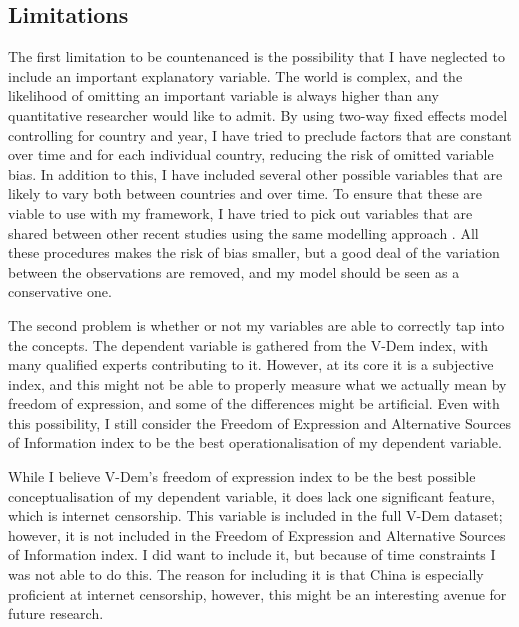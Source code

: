 \subsection{Limitations}
The first limitation to be countenanced is the possibility that I have neglected to include an important explanatory variable. The world is complex, and the likelihood of omitting an important variable is always higher than any quantitative researcher would like to admit. By using two-way fixed effects model controlling for country and year, I have tried to preclude factors that are constant over time and for each individual country, reducing the risk of omitted variable bias. In addition to this, I have included several other possible variables that are likely to vary both between countries and over time. To ensure that these are viable to use with my framework, I have tried to pick out variables that are shared between other recent studies using the same modelling approach \citep{gamso_is_2021, toettoe_foreign_2023}. All these procedures makes the risk of bias smaller, but a good deal of the variation between the observations are removed, and my model should be seen as a conservative one. 

The second problem is whether or not my variables are able to correctly tap into the concepts. The dependent variable is gathered from the V-Dem index, with many qualified experts contributing to it. However, at its core it is a subjective index, and this might not be able to properly measure what we actually mean by freedom of expression, and some of the differences might be artificial. Even with this possibility, I still consider the Freedom of Expression and Alternative Sources of Information index to be the best operationalisation of my dependent variable.

While I believe V-Dem's freedom of expression index to be the best possible conceptualisation of my dependent variable, it does lack one significant feature, which is internet censorship. This variable is included in the full V-Dem dataset; however, it is not included in the Freedom of Expression and Alternative Sources of Information index. I did want to include it, but because of time constraints I was not able to do this. The reason for including it is that China is especially proficient at internet censorship, however, this might be an interesting avenue for future research.

